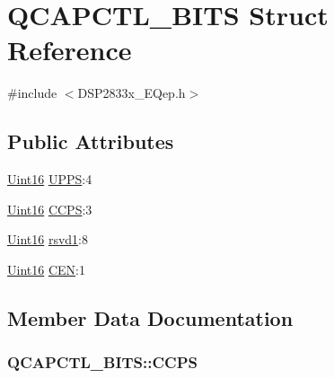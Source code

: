\hypertarget{struct_q_c_a_p_c_t_l___b_i_t_s}{}\section{Q\+C\+A\+P\+C\+T\+L\+\_\+\+B\+I\+T\+S Struct Reference}
\label{struct_q_c_a_p_c_t_l___b_i_t_s}


{\ttfamily \#include $<$D\+S\+P2833x\+\_\+\+E\+Qep.\+h$>$}

\subsection*{Public Attributes}
\begin{DoxyCompactItemize}
\item 
\hyperlink{_d_s_p2833x___device_8h_a59a9f6be4562c327cbfb4f7e8e18f08b}{Uint16} \hyperlink{struct_q_c_a_p_c_t_l___b_i_t_s_ad78cd88f44cbda76e1774f3742ea8679}{U\+P\+P\+S}\+:4
\item 
\hyperlink{_d_s_p2833x___device_8h_a59a9f6be4562c327cbfb4f7e8e18f08b}{Uint16} \hyperlink{struct_q_c_a_p_c_t_l___b_i_t_s_a75b6467faee15df6489e78ce9ecbecdf}{C\+C\+P\+S}\+:3
\item 
\hyperlink{_d_s_p2833x___device_8h_a59a9f6be4562c327cbfb4f7e8e18f08b}{Uint16} \hyperlink{struct_q_c_a_p_c_t_l___b_i_t_s_a2123297ac09dbbc73071d4752108e876}{rsvd1}\+:8
\item 
\hyperlink{_d_s_p2833x___device_8h_a59a9f6be4562c327cbfb4f7e8e18f08b}{Uint16} \hyperlink{struct_q_c_a_p_c_t_l___b_i_t_s_a6bb69fea54c791802690eb23c1fe1e8c}{C\+E\+N}\+:1
\end{DoxyCompactItemize}


\subsection{Member Data Documentation}
\hypertarget{struct_q_c_a_p_c_t_l___b_i_t_s_a75b6467faee15df6489e78ce9ecbecdf}{}
\subsubsection[{C\+C\+P\+S}]{ Q\+C\+A\+P\+C\+T\+L\+\_\+\+B\+I\+T\+S\+::\+C\+C\+P\+S}\label{struct_q_c_a_p_c_t_l___b_i_t_s_a75b6467faee15df6489e78ce9ecbecdf}
\hypertarget{struct_q_c_a_p_c_t_l___b_i_t_s_a6bb69fea54c791802690eb23c1fe1e8c}{}
